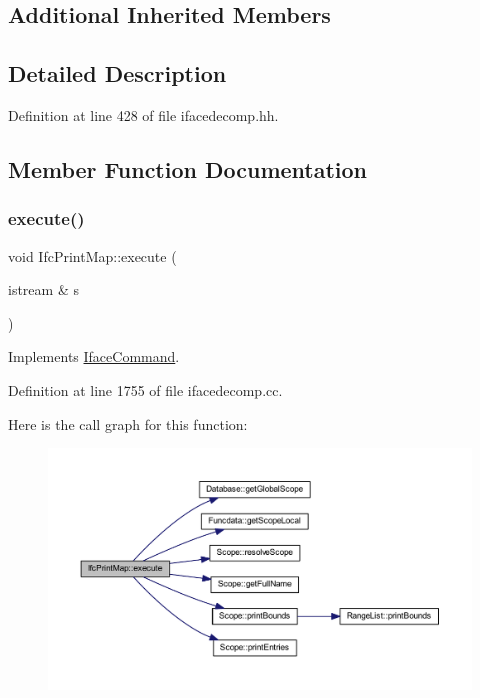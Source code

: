 \subsection*{Additional Inherited Members}


\subsection{Detailed Description}


Definition at line 428 of file ifacedecomp.\+hh.



\subsection{Member Function Documentation}
\mbox{\label{class_ifc_print_map_a5508ed1c8729f4e1d5172e5275423b59}} 
\subsubsection{\texorpdfstring{execute()}{execute()}}
{\footnotesize\ttfamily void Ifc\+Print\+Map\+::execute (\begin{DoxyParamCaption}\item[{istream \&}]{s }\end{DoxyParamCaption})\hspace{0.3cm}{\ttfamily [virtual]}}



Implements \mbox{\hyperlink{class_iface_command_af10e29cee2c8e419de6efe9e680ad201}{Iface\+Command}}.



Definition at line 1755 of file ifacedecomp.\+cc.

Here is the call graph for this function\+:
\nopagebreak
\begin{figure}[H]
\begin{center}
\leavevmode
\includegraphics[width=350pt]{class_ifc_print_map_a5508ed1c8729f4e1d5172e5275423b59_cgraph}
\end{center}
\end{figure}


